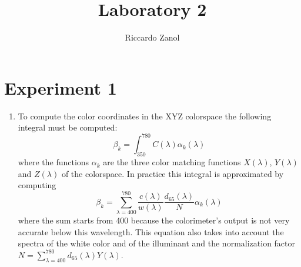 \documentclass{article}
\author{Riccardo Zanol}
\title{Laboratory 2}
\begin{document}
\maketitle
\section*{Experiment 1}
\begin{enumerate}
\item To compute the color coordinates in the XYZ colorspace the
  following integral must be computed:
  \[ \beta_k = \int_{350}^{780} C(\lambda)\alpha_k(\lambda) \]
  where the functions $\alpha_k$ are the three color matching
  functions $X(\lambda)$, $Y(\lambda)$ and $Z(\lambda)$ of the
  colorspace. In practice this integral is approximated by computing
  \[ \beta_k = \sum_{\lambda=400}^{780} \frac{c(\lambda)}{w(\lambda)}\frac{d_{65}(\lambda)}{N} \alpha_k(\lambda) \]
  where the sum starts from 400 because the colorimeter's output is
  not very accurate below this wavelength. This equation also takes
  into account the spectra of the white color and of the illuminant
  and the normalization factor $N =
  \sum_{\lambda=400}^{780}d_{65}(\lambda)Y(\lambda)$.


\end{enumerate}
\end{document}
